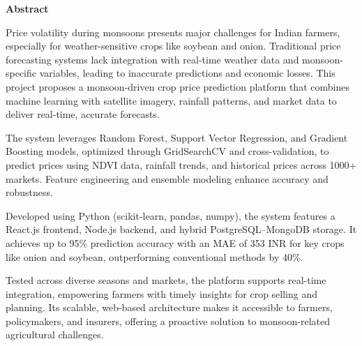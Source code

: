 \vspace{-1cm}

\begin{center}
	\textbf{\Large Abstract}
\end{center}

Price volatility during monsoons presents major challenges for Indian farmers, especially for weather-sensitive crops like soybean and onion. Traditional price forecasting systems lack integration with real-time weather data and monsoon-specific variables, leading to inaccurate predictions and economic losses. This project proposes a monsoon-driven crop price prediction platform that combines machine learning with satellite imagery, rainfall patterns, and market data to deliver real-time, accurate forecasts.

The system leverages Random Forest, Support Vector Regression, and Gradient Boosting models, optimized through GridSearchCV and cross-validation, to predict prices using NDVI data, rainfall trends, and historical prices across 1000+ markets. Feature engineering and ensemble modeling enhance accuracy and robustness.

Developed using Python (scikit-learn, pandas, numpy), the system features a React.js frontend, Node.js backend, and hybrid PostgreSQL–MongoDB storage. It achieves up to 95\% prediction accuracy with an MAE of 353 INR for key crops like onion and soybean, outperforming conventional methods by 40\%.

Tested across diverse seasons and markets, the platform supports real-time integration, empowering farmers with timely insights for crop selling and planning. Its scalable, web-based architecture makes it accessible to farmers, policymakers, and insurers, offering a proactive solution to monsoon-related agricultural challenges.

\pagebreak
